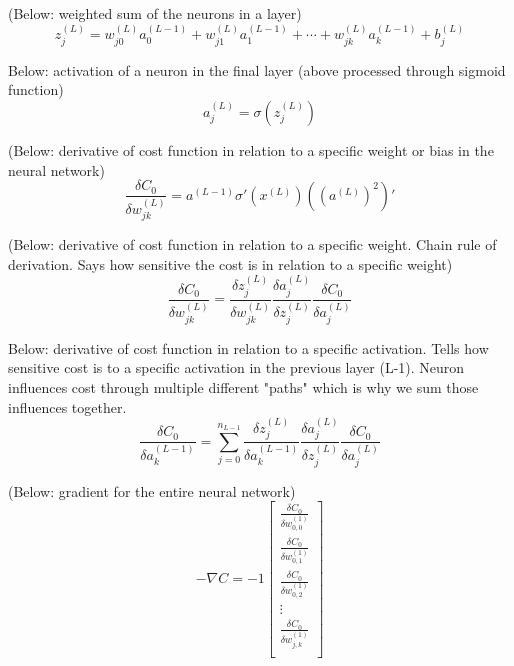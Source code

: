 \documentclass[12pt,a4paper,notitlepage]{article}
\begin{document}
(Below: weighted sum of the neurons in a layer)
\begin{displaymath}
	z_j^{(L)} = w_{j0}^{(L)}a_0^{(L-1)} + w_{j1}^{(L)}a_1^{(L-1)} + \cdots + w_{jk}^{(L)}a_k^{(L-1)} + b_j^{(L)}
\end{displaymath}

Below: activation of a neuron in the final layer (above processed through sigmoid function)
\begin{displaymath}
	a_j^{(L)} = \sigma\left(z_j^{(L)}\right)
\end{displaymath}

(Below: derivative of cost function in relation to a specific weight or bias in the neural network)
\begin{displaymath}
	\frac{\delta C_0}{\delta w_{jk}^{(L)}} = a^{(L-1)} \sigma\prime(x^{(L)})((a^{(L)})^2)\prime
\end{displaymath}

(Below: derivative of cost function in relation to a specific weight. Chain rule of derivation. Says how sensitive the cost is in relation to a specific weight)
\begin{displaymath}
	\frac{\delta C_0}{\delta w_{jk}^{(L)}} = 
	\frac{\delta z_j^{(L)}}{\delta w_{jk}^{(L)}}
	\frac{\delta a_j^{(L)}}{\delta z_j^{(L)}}
	\frac{\delta C_0}{\delta a_j^{(L)}}
\end{displaymath}

Below: derivative of cost function in relation to a specific activation. Tells how sensitive cost is to a specific activation in the previous layer (L-1). Neuron influences cost through multiple different "paths" which is why we sum those influences together.
\begin{displaymath}
	\frac{\delta C_0}{\delta a_{k}^{(L-1)}} = 
	\sum_{j=0}^{n_{L-1}}
	\frac{\delta z_j^{(L)}}{\delta a_{k}^{(L-1)}}
	\frac{\delta a_j^{(L)}}{\delta z_j^{(L)}}
	\frac{\delta C_0}{\delta a_j^{(L)}}
\end{displaymath}

(Below: gradient for the entire neural network)
\begin{displaymath}
	-\nabla C =
	-1 \begin{bmatrix}
		\frac{\delta C_0}{\delta w_{0,0}^{(1)}}\\
		\frac{\delta C_0}{\delta w_{0,1}^{(1)}}\\
		\frac{\delta C_0}{\delta w_{0,2}^{(1)}}\\
		\vdots\\
		\frac{\delta C_0}{\delta w_{j,k}^{(1)}}\\
	\end{bmatrix}
\end{displaymath}
\end{document}
